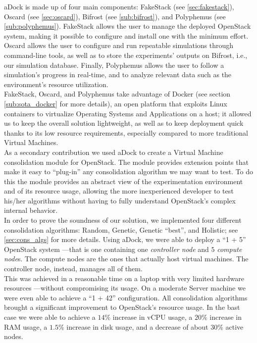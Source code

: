 aDock is made up of four main components: FakeStack (see \ref{sec:fakestack}), Oscard (see \ref{sec:oscard}), Bifrost (see \ref{sub:bifrost}), and Polyphemus (see \ref{sub:polyphemus}). FakeStack allows the user to manage the deployed OpenStack system, making it possible to configure and install one with the minimum effort. Oscard allows the user to configure and run repeatable simulations through command-line tools, as well as to store the experiments' outputs on Bifrost, i.e., our simulation database. Finally, Polyphemus allows the user to follow a simulation's progress in real-time, and to analyze relevant data such as the environment's resource utilization.\\
FakeStack, Oscard, and Polyphemus take advantage of Docker (see section \ref{sub:sota_docker} for more details), an open platform that exploits Linux containers to virtualize Operating Systems and Applications on a host; it allowed us to keep the overall solution lightweight, as well as to keep deployment quick thanks to its low resource requirements, especially compared to more traditional Virtual Machines.\\
As a secondary contribution we used aDock to create a Virtual Machine consolidation module for OpenStack. The module provides extension points that make it easy to ``plug-in'' any consolidation algorithm we may want to test. To do this the module provides an abstract view of the experimentation environment and of its resource usage, allowing the more inexperienced developer to test his/her algorithms without having to fully understand OpenStack's complex internal behavior.\\
In order to prove the soundness of our solution, we implemented four different consolidation algorithms: Random, Genetic, Genetic ``best'', and Holistic; see \ref{sec:cons_algs} for more details. Using aDock, we were able to deploy a ``1 + 5'' OpenStack system ---that is one containing one \textit{controller node} and $5$ \textit{compute node}s. The compute nodes are the ones that actually host virtual machines. The controller node, instead, manages all of them.\\
This was achieved in a reasonable time on a laptop with very limited hardware resources ---without compromising its usage. On a moderate Server machine we were even able to achieve a ``1 + 42'' configuration. All consolidation algorithms brought a significant improvement to OpenStack's resource usage. In the bast case we were able to achieve a $14\%$ increase in vCPU usage, a $20\%$ increase in RAM usage, a $1.5\%$ increase in disk usage, and a decrease of about $30\%$ active nodes. 
